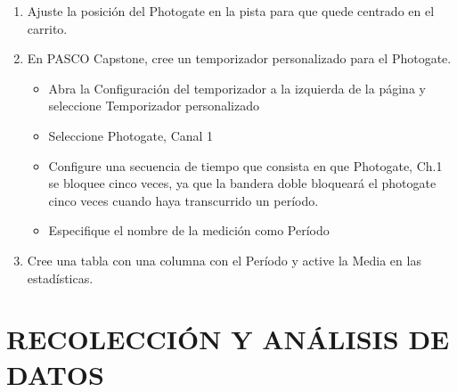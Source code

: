 \documentclass[9pt,a4paper,twocolumn,twoside]{tau-class/tau}
\begin{document}
\begin{enumerate}
    \item Ajuste la posición del Photogate en la pista para que quede centrado en el carrito.
    \item En PASCO Capstone, cree un temporizador personalizado para el Photogate.
        \begin{itemize}
            \item Abra la Configuración del temporizador a la izquierda de la página y seleccione Temporizador personalizado
            \item Seleccione Photogate, Canal 1
            \item Configure una secuencia de tiempo que consista en que Photogate, Ch.1 se bloquee cinco veces, ya que la bandera doble bloqueará el photogate cinco veces cuando haya transcurrido un período.
            \item Especifique el nombre de la medición como Período            
        \end{itemize}
    \item Cree una tabla con una columna con el Período y active la Media en las estadísticas.
\end{enumerate}



\section{RECOLECCIÓN Y ANÁLISIS DE DATOS}
\end{document}
